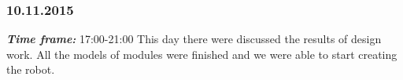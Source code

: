 \subsubsection{10.11.2015}
\textit{\textbf{Time frame:}} 17:00-21:00 \newline
This day there were discussed the results of design work. All the models of modules were finished and we were able to start creating the robot.
